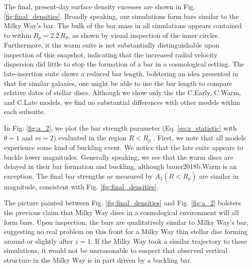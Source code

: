 The final, present-day surface density excesses are shown in Fig. \ref{fig:final_densities}. Broadly speaking, our simulations form bars similar to the Milky Way's bar.  The bulk of the bar mass in all simulations appears contained to within $R_p = 2.2\, R_d$, as shown by visual inspection of the inner circles. Furthermore, it the warm suite is not substantially distinguishable upon inspection of this snapshot, indicating that the increased radial velocity dispersion did little to stop the formation of a bar in a cosmological setting.   The late-insertion suite shows a reduced bar length, bolstering an idea presented in \citet{bauer2018b} that for similar galaxies, one might be able to use the bar length to compare relative dates of stellar discs. Although we show only the the C.Early, C.Warm, and C.Late models, we find no substantial differences with other models within each subsuite.


In Fig. \ref{fig:a_2}, we plot the bar strength parameter (Eq. \eqref{eq:z_statistic} with $\theta=1$ and $m=2$)  evaluated in the region $R < R_p$ \citep{debattista_sellwood_2000}. First, we note that all models experience some kind of buckling event. We notice that the late suite appears to buckle lower magnitudes. Generally speaking, we see that the warm discs are delayed in their bar formation and buckling, although bauer2018b.Warm is an exception. The final bar strengths as measured by $A_2(R<R_p)$ are similar in magnitude, consistent with Fig. \ref{fig:final_densities}.



The picture painted between Fig. \ref{fig:final_densities} and Fig. \ref{fig:a_2} bolsters the previous claim that Milky Way discs in a cosmological environment will all form bars. Upon inspection, the bars are qualitatively similar to Milky Way's bar, suggesting no real problem on this front for a Milky Way thin stellar disc forming around or slightly after $z=1$. If the Milky Way took a similar trajectory to these simulations, it would not be unreasonable to suspect that observed vertical structure in the Milky Way is in part driven by a buckling bar.


